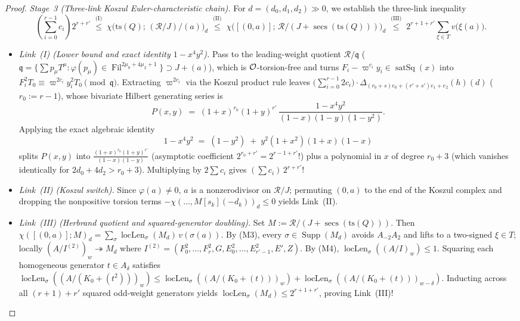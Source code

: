 \begin{proof}
\emph{Stage~3 (Three-link Koszul Euler-characteristic chain).}
For $d = (d_0, d_1, d_2) \gg 0$, we establish the three-link inequality
\begin{equation}
\label{eq:20:three-link}
  \left(\sum_{i=0}^{r-1} c_i\right) 2^{r + r'}
  \;\overset{\text{(I)}}{\le}\; \chi\bigl(\mathrm{ts}(Q);\, (\mathcal{R}/J)/(a)\bigr)_d
  \;\overset{\text{(II)}}{\le}\; \chi\bigl([(0, a)];\, \mathcal{R}/(J + \operatorname{secs}(\mathrm{ts}(Q)))\bigr)_d
  \;\overset{\text{(III)}}{\le}\; 2^{r + 1 + r'} \sum_{\xi \in T} v\bigl(\xi(a)\bigr).
\end{equation}
\begin{itemize}
\item \emph{Link~(I) (Lower bound and exact identity $1 - x^4 y^2$).} Pass to the leading-weight quotient $\mathcal{R}/\mathfrak{q}$ ($\mathfrak{q} = \{\sum p_\mu T^\mu : \varphi(p_\mu) \in \operatorname{Fil}^{2\mu_0 + 4\mu_2 + 1}\} \supset J + (a)$), which is $\mathcal{O}$-torsion-free and turns $F_i - \varpi^{c_i} y_i \in \operatorname{satSq}(x)$ into $F_i^2 T_0 \equiv \varpi^{2c_i} y_i^2 T_0 \pmod{\mathfrak{q}}$. Extracting $\varpi^{2c_i}$ via the Koszul product rule leaves $\bigl(\sum_{i=0}^{r-1} 2 c_i\bigr) \cdot \Delta_{(r_0+s)e_0 + (r'+s')e_1 + e_2}(h)(d)$ ($r_0 := r - 1$), whose bivariate Hilbert generating series is
  \[
    P(x, y) \;=\; (1 + x)^{r_0}(1 + y)^{r'}\,\frac{1 - x^4 y^2}{(1 - x)(1 - y)(1 - y^2)}.
  \]
  Applying the exact algebraic identity
  \begin{equation}
  \label{eq:20:1-x4y2}
    1 - x^4 y^2 \;=\; (1 - y^2) \;+\; y^2(1 + x^2)(1 + x)(1 - x)
  \end{equation}
  splits $P(x, y)$ into $\frac{(1+x)^{r_0}(1+y)^{r'}}{(1-x)(1-y)}$ (asymptotic coefficient $2^{r_0 + r'} = 2^{r - 1 + r'}$!) plus a polynomial in $x$ of degree $r_0 + 3$ (which vanishes identically for $2 d_0 + 4 d_2 > r_0 + 3$). Multiplying by $2\sum c_i$ gives $(\sum c_i)\, 2^{r + r'}$!
\item \emph{Link~(II) (Koszul switch).} Since $\varphi(a) \neq 0$, $a$ is a nonzerodivisor on $\mathcal{R}/J$; permuting $(0, a)$ to the end of the Koszul complex and dropping the nonpositive torsion terms $-\chi(\dots, M[s_k](-d_k))_d \le 0$ yields Link~(II).
\item \emph{Link~(III) (Herbrand quotient and squared-generator doubling).} Set $M := \mathcal{R}/(J + \operatorname{secs}(\mathrm{ts}(Q)))$. Then $\chi([(0, a)]; M)_d = \sum_{\sigma} \operatorname{locLen}_\sigma(M_d)\, v(\sigma(a))$. By (M3), every $\sigma \in \operatorname{Supp}(M_d)$ avoids $A_{-2} A_2$ and lifts to a two-signed $\xi \in T$; locally $(A / I^{(2)})_w \twoheadrightarrow M_d$ where $I^{(2)} = (F_0^2, \dots, F_r^2, G, E_0^2, \dots, E_{r'-1}^2, E', Z)$. By (M4), $\operatorname{locLen}_\sigma((A/I)_w) \le 1$. Squaring each homogeneous generator $t \in A_\delta$ satisfies $\operatorname{locLen}_\sigma((A/(K_0 + (t^2)))_w) \le \operatorname{locLen}_\sigma((A/(K_0+(t)))_w) + \operatorname{locLen}_\sigma((A/(K_0+(t)))_{w-\delta})$. Inducting across all $(r+1) + r'$ squared odd-weight generators yields $\operatorname{locLen}_\sigma(M_d) \le 2^{r + 1 + r'}$, proving Link~(III)!
\end{itemize}


\end{proof}
